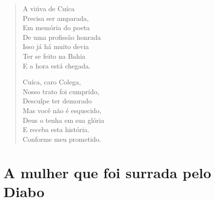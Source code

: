 \begin{verse}
A viúva de Cuíca \\
Precisa ser amparada, \\
Em memória do poeta \\
De uma profissão honrada \\
Isso já há muito devia \\
Ter se feito na Bahia \\
E a hora está chegada. 
\pagebreak

Cuíca, caro Colega, \\
Nosso trato foi cumprido, \\
Desculpe ter demorado \\
Mas você não é esquecido, \\
Deus o tenha em sua glória \\
E receba esta história. \\
Conforme meu prometido. 
\end{verse}

\chapter{A mulher que foi surrada pelo Diabo}

